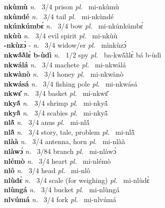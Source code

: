 {\bfseries nkùmù}  {\itshape n.~} 3/4 prison {\itshape pl.~} mi-nkùmù    \\ 
{\bfseries nkùndé}  {\itshape n.~} 3/4 tail {\itshape pl.~} mi-nkùndé    \\ 
{\bfseries nkúnkúmbɛ́}  {\itshape n.~} 3/4 bow {\itshape pl.~} mi-nkúnkúmbɛ́    \\ 
{\bfseries nkùù}  {\itshape n.~} 3/4 evil spirit {\itshape pl.~} mi-nkùù    \\ 
{\bfseries -nkùzɔ́} - {\itshape n.~} 3/4 widow/er {\itshape pl.~} mìnkùzɔ́    \\ 
{\bfseries nkwã́ã̀lɛ̀ b-ùdì}  {\itshape n.~} 1/2 spy {\itshape pl.~} ba-kwã́ã̀lɛ̀ bá b-ùdì    \\ 
{\bfseries nkwálá}  {\itshape n.~} 3/4 machete {\itshape pl.~} mi-nkwálá    \\ 
{\bfseries nkwànò}  {\itshape n.~} 3/4 honey {\itshape pl.~} mi-nkwànò    \\ 
{\bfseries nkwásá}  {\itshape n.~} 3/4 fishing pole {\itshape pl.~} mi-nkwásá    \\ 
{\bfseries nkwɛ̌}  {\itshape n.~} 3/4 basket {\itshape pl.~} mi-nkwɛ̌    \\ 
{\bfseries nkyã́}  {\itshape n.~} 3/4 shrimp {\itshape pl.~} mi-nkyã́    \\ 
{\bfseries nkyã̂}  {\itshape n.~} 3/4 scabies {\itshape pl.~} mi-nkyã̂    \\ 
{\bfseries nlã́}  {\itshape n.~} 3/4 anus {\itshape pl.~} mi-nlã́    \\ 
{\bfseries nlã̂}  {\itshape n.~} 3/4 story, tale, problem {\itshape pl.~} mi-nlã̂    \\ 
{\bfseries nlàà}  {\itshape n.~} 3/4 antenna, horn {\itshape pl.~} mi-nlàà    \\ 
{\bfseries nlàwɔ́}  {\itshape n.~} 3/84 branch {\itshape pl.~} mi-nlàwɔ́    \\ 
{\bfseries nlémò}  {\itshape n.~} 3/4 heart {\itshape pl.~} mi-nlémò    \\ 
{\bfseries nlô}  {\itshape n.~} 3/4 head {\itshape pl.~} mi-nlô    \\ 
{\bfseries nlùdɛ̀}  {\itshape n.~} 3/4 scale (for weighing) {\itshape pl.~} mi-nlùdɛ̀    \\ 
{\bfseries nlùngá}  {\itshape n.~} 3/4 bucket {\itshape pl.~} mi-nlùngá    \\ 
{\bfseries nlvúmá}  {\itshape n.~} 3/4 fork {\itshape pl.~} mi-nlvúmá    \\ 
